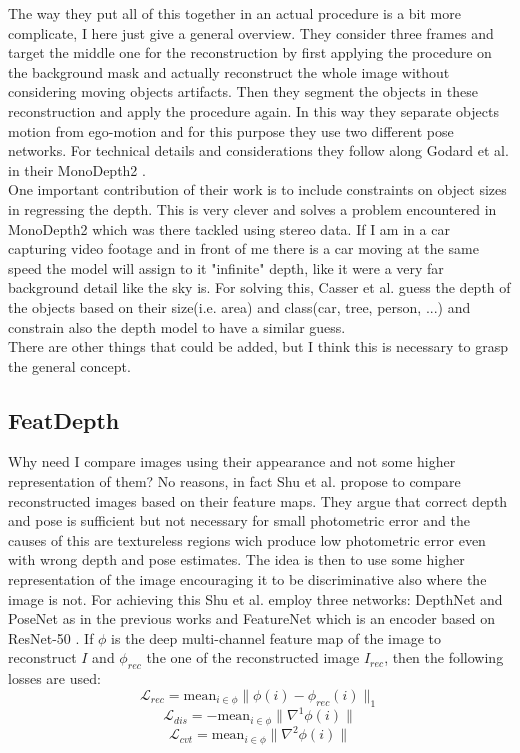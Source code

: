 The way they put all of this together in an actual procedure is a bit more complicate, I here just give a general overview. They consider three frames and target the middle one for the reconstruction by first applying the procedure on the background mask and actually reconstruct the whole image without considering moving objects artifacts. Then they segment the objects in these reconstruction and apply the procedure again. In this way they separate objects motion from ego-motion and for this purpose they use two different pose networks. For technical details and considerations they follow along Godard et al. in their MonoDepth2 \cite{MonoDepth2}.\\
One important contribution of their work is to include constraints on object sizes in regressing the depth. This is very clever and solves a problem encountered in MonoDepth2 which was there tackled using stereo data. If I am in a car capturing video footage and in front of me there is a car moving at the same speed the model will assign to it "infinite" depth, like it were a very far background detail like the sky is. For solving this, Casser et al. guess the depth of the objects based on their size(i.e. area) and class(car, tree, person, ...) and constrain also the depth model to have a similar guess.\\
There are other things that could be added, but I think this is necessary to grasp the general concept.

\subsection{FeatDepth}
Why need I compare images using their appearance and not some higher representation of them? No reasons, in fact Shu et al. \cite{FeatDepth} propose to compare reconstructed images based on their feature maps. They argue that correct depth and pose is sufficient but not necessary for small photometric error and the causes of this are textureless regions wich produce low photometric error even with wrong depth and pose estimates. The idea is then to use some higher representation of the image encouraging it to be discriminative also where the image is not. For achieving this Shu et al. employ three networks: DepthNet and PoseNet as in the previous works and FeatureNet which is an encoder based on ResNet-50 \cite{ResNet}. If $\phi$ is the deep multi-channel feature map of the image to reconstruct $I$ and $\phi_{rec}$ the one of the reconstructed image $I_{rec}$, then the following losses are used:
\[
	\mathcal{L}_{rec} = \text{mean}_{i \in \phi} \big\| \phi(i) - \phi_{rec}(i) \big\|_{1}
\] \[
	\mathcal{L}_{dis} = - \text{mean}_{i \in \phi} \big\| \nabla^{1} \phi(i) \big\|
\] \[
	\mathcal{L}_{cvt} = \text{mean}_{i \in \phi} \big\| \nabla^{2} \phi(i) \big\|
\]

